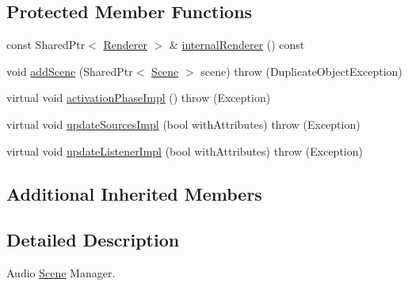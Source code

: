 \subsection*{Protected Member Functions}
\begin{DoxyCompactItemize}
\item 
const Shared\+Ptr$<$ \hyperlink{classAudio_1_1Renderer}{Renderer} $>$ \& \hyperlink{classAudio_1_1SceneManager_a25e01695620c8cf9cb39741c9360c5f4}{internal\+Renderer} () const 
\item 
void \hyperlink{classAudio_1_1SceneManager_a903b7e1dc51ba5ce5f5d1d9f204e625e}{add\+Scene} (Shared\+Ptr$<$ \hyperlink{classAudio_1_1Scene}{Scene} $>$ scene)  throw (\+Duplicate\+Object\+Exception)
\item 
virtual void \hyperlink{classAudio_1_1SceneManager_a397edaf6740964a72ad2aadb49d63843}{activation\+Phase\+Impl} ()  throw (\+Exception)
\item 
virtual void \hyperlink{classAudio_1_1SceneManager_a9b4b6cc0b7fab0925862623905801c11}{update\+Sources\+Impl} (bool with\+Attributes)  throw (\+Exception)
\item 
virtual void \hyperlink{classAudio_1_1SceneManager_a88b31cdeeddadee7e3b954c18ac462aa}{update\+Listener\+Impl} (bool with\+Attributes)  throw (\+Exception)
\end{DoxyCompactItemize}
\subsection*{Additional Inherited Members}


\subsection{Detailed Description}
Audio \hyperlink{classAudio_1_1Scene}{Scene} Manager.

